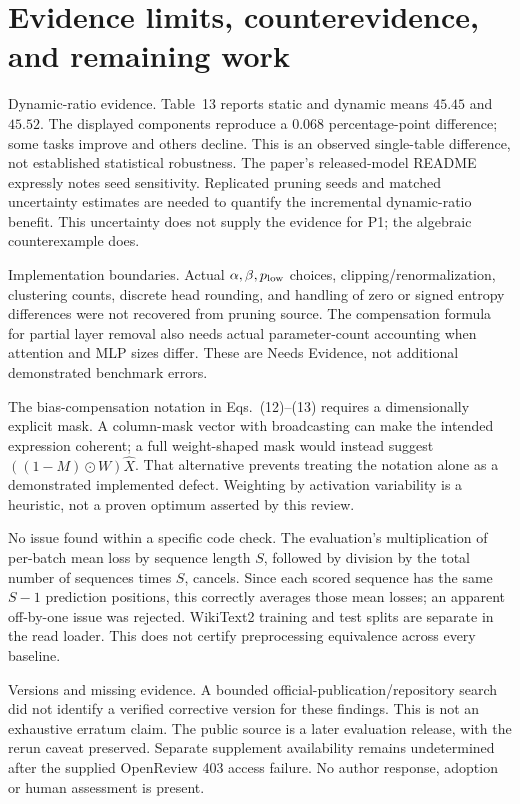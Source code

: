 \documentclass[10pt]{article}
\begin{document}
\section*{Evidence limits, counterevidence, and remaining work}
Dynamic-ratio evidence. Table 13 reports static and dynamic means \(45.45\) and \(45.52\). The displayed components reproduce a \(0.068\) percentage-point difference; some tasks improve and others decline. This is an observed single-table difference, not established statistical robustness. The paper’s released-model README expressly notes seed sensitivity. Replicated pruning seeds and matched uncertainty estimates are needed to quantify the incremental dynamic-ratio benefit. This uncertainty does not supply the evidence for P1; the algebraic counterexample does.\par
Implementation boundaries. Actual \(\alpha,\beta,p_{\rm low}\) choices, clipping/renormalization, clustering counts, discrete head rounding, and handling of zero or signed entropy differences were not recovered from pruning source. The compensation formula for partial layer removal also needs actual parameter-count accounting when attention and MLP sizes differ. These are Needs Evidence, not additional demonstrated benchmark errors.\par
The bias-compensation notation in Eqs. (12)–(13) requires a dimensionally explicit mask. A column-mask vector with broadcasting can make the intended expression coherent; a full weight-shaped mask would instead suggest \(((1-M)\odot W)\widehat X\). That alternative prevents treating the notation alone as a demonstrated implemented defect. Weighting by activation variability is a heuristic, not a proven optimum asserted by this review.\par
No issue found within a specific code check. The evaluation’s multiplication of per-batch mean loss by sequence length \(S\), followed by division by the total number of sequences times \(S\), cancels. Since each scored sequence has the same \(S-1\) prediction positions, this correctly averages those mean losses; an apparent off-by-one issue was rejected. WikiText2 training and test splits are separate in the read loader. This does not certify preprocessing equivalence across every baseline.\par
Versions and missing evidence. A bounded official-publication/repository search did not identify a verified corrective version for these findings. This is not an exhaustive erratum claim. The public source is a later evaluation release, with the rerun caveat preserved. Separate supplement availability remains undetermined after the supplied OpenReview 403 access failure. No author response, adoption or human assessment is present.\par
\end{document}
